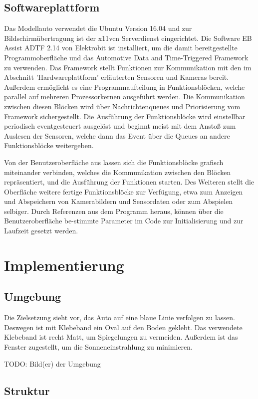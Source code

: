 \documentclass[12pt, a4paper]{scrartcl}
\begin{document}
\subsection{Softwareplattform}
Das Modellauto verwendet die Ubuntu Version 16.04 und zur Bildschirmübertragung ist der x11vcn Serverdienst eingerichtet. Die Software EB Assist ADTF 2.14 von Elektrobit ist installiert, um die damit bereitgestellte Programmoberfläche und das Automotive Data and Time-Triggered Framework zu verwenden. Das Framework stellt Funktionen zur Kommunikation mit den im Abschnitt 'Hardwareplattform' erläuterten Sensoren und Kameras bereit. Außerdem ermöglicht es eine Programmaufteilung in Funktionsblöcken, welche parallel auf mehreren Prozessorkernen ausgeführt werden. Die Kommunikation zwischen diesen Blöcken wird über Nachrichtenqueues und Priorisierung vom Framework sichergestellt. Die Ausführung der Funktionsblöcke wird einstellbar periodisch eventgesteuert ausgelöst und beginnt meist mit dem Anstoß zum Auslesen der Sensoren, welche dann das Event über die Queues an andere Funktionsblöcke weitergeben.

Von der Benutzeroberfläche aus lassen sich die Funktionsblöcke grafisch miteinander verbinden, welches die Kommunikation zwischen den Blöcken repräsentiert, und die Ausführung der Funktionen starten. Des Weiteren stellt die Oberfläche weitere fertige Funktionsblöcke zur Verfügung, etwa zum Anzeigen und Abspeichern von Kamerabildern und Sensordaten oder zum  Abspielen selbiger.
Durch Referenzen aus dem Programm heraus, können über die Benutzeroberfläche be-stimmte Parameter im Code zur Initialisierung und zur Laufzeit gesetzt werden.


\section{Implementierung}

\subsection{Umgebung}

Die Zielsetzung sieht vor, das Auto auf eine blaue Linie verfolgen zu lassen. Deswegen ist mit Klebeband ein Oval auf den Boden geklebt. Das verwendete Klebeband ist recht Matt, um Spiegelungen zu vermeiden. Außerdem ist das Fenster zugestellt, um die Sonneneinstrahlung zu minimieren.

TODO: Bild(er) der Umgebung

\subsection{Struktur}
\end{document}
